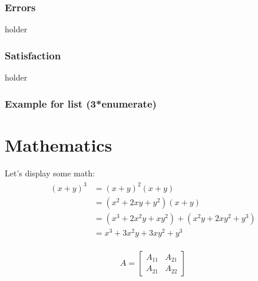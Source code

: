 \documentclass[paper=a4, fontsize=11pt]{scrartcl}	%
\numberwithin{equation}{section}															%
\numberwithin{figure}{section}																%
\numberwithin{table}{section}																%
\begin{document}
\subsubsection{Errors}
holder

\subsubsection{Satisfaction}
holder









\subsubsection{Example for list (3*enumerate)}




\section{Mathematics}
Let's display some math:
\begin{align} 
	\begin{split}
	(x+y)^3 	&= (x+y)^2(x+y)\\
					&=(x^2+2xy+y^2)(x+y)\\
					&=(x^3+2x^2y+xy^2) + (x^2y+2xy^2+y^3)\\
					&=x^3+3x^2y+3xy^2+y^3
	\end{split}					
\end{align}

\begin{align}
	A = 
	\begin{bmatrix}
	A_{11} & A_{21} \\
  	A_{21} & A_{22}
	\end{bmatrix}
\end{align}
\end{document}
